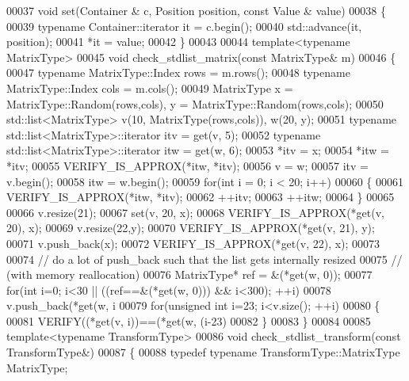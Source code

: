 \begin{DoxyCode}
00037 \textcolor{keywordtype}{void} \textcolor{keyword}{set}(Container & c, Position position, \textcolor{keyword}{const} Value & value)
00038 \{
00039   \textcolor{keyword}{typename} Container::iterator it = c.begin();
00040   std::advance(it, position);
00041   *it = value;
00042 \}
00043 
00044 \textcolor{keyword}{template}<\textcolor{keyword}{typename} MatrixType>
00045 \textcolor{keywordtype}{void} check\_stdlist\_matrix(\textcolor{keyword}{const} MatrixType& m)
00046 \{
00047   \textcolor{keyword}{typename} MatrixType::Index rows = m.rows();
00048   \textcolor{keyword}{typename} MatrixType::Index cols = m.cols();
00049   MatrixType x = MatrixType::Random(rows,cols), y = MatrixType::Random(rows,cols);
00050   std::list<MatrixType> v(10, MatrixType(rows,cols)), w(20, y);
00051   \textcolor{keyword}{typename} std::list<MatrixType>::iterator itv = \textcolor{keyword}{get}(v, 5);
00052   \textcolor{keyword}{typename} std::list<MatrixType>::iterator itw = \textcolor{keyword}{get}(w, 6);
00053   *itv = x;
00054   *itw = *itv;
00055   VERIFY\_IS\_APPROX(*itw, *itv);
00056   v = w;
00057   itv = v.begin();
00058   itw = w.begin();
00059   \textcolor{keywordflow}{for}(\textcolor{keywordtype}{int} i = 0; i < 20; i++)
00060   \{
00061     VERIFY\_IS\_APPROX(*itw, *itv);
00062     ++itv;
00063     ++itw;
00064   \}
00065 
00066   v.resize(21);
00067   \textcolor{keyword}{set}(v, 20, x);
00068   VERIFY\_IS\_APPROX(*\textcolor{keyword}{get}(v, 20), x);
00069   v.resize(22,y);
00070   VERIFY\_IS\_APPROX(*\textcolor{keyword}{get}(v, 21), y);
00071   v.push\_back(x);
00072   VERIFY\_IS\_APPROX(*\textcolor{keyword}{get}(v, 22), x);
00073 
00074   \textcolor{comment}{// do a lot of push\_back such that the list gets internally resized}
00075   \textcolor{comment}{// (with memory reallocation)}
00076   MatrixType* ref = &(*\textcolor{keyword}{get}(w, 0));
00077   \textcolor{keywordflow}{for}(\textcolor{keywordtype}{int} i=0; i<30 || ((ref==&(*\textcolor{keyword}{get}(w, 0))) && i<300); ++i)
00078     v.push\_back(*\textcolor{keyword}{get}(w, i%
00079   \textcolor{keywordflow}{for}(\textcolor{keywordtype}{unsigned} \textcolor{keywordtype}{int} i=23; i<v.size(); ++i)
00080   \{
00081     VERIFY((*\textcolor{keyword}{get}(v, i))==(*\textcolor{keyword}{get}(w, (i-23)%
00082   \}
00083 \}
00084 
00085 \textcolor{keyword}{template}<\textcolor{keyword}{typename} TransformType>
00086 \textcolor{keywordtype}{void} check\_stdlist\_transform(\textcolor{keyword}{const} TransformType&)
00087 \{
00088   \textcolor{keyword}{typedef} \textcolor{keyword}{typename} TransformType::MatrixType MatrixType;

\end{DoxyCode}
